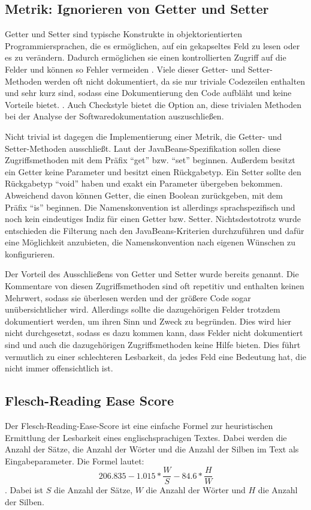\subsection{Metrik: Ignorieren von Getter und Setter }
Getter und Setter sind typische Konstrukte in objektorientierten Programmiersprachen, die es ermöglichen, auf ein gekapseltes Feld zu lesen oder es zu verändern. Dadurch ermöglichen sie einen kontrollierten Zugriff auf die Felder und können so Fehler vermeiden \cite[S. 235]{OntheUseofPropertiesinJavaApplications}. Viele dieser Getter- und Setter-Methoden werden oft nicht dokumentiert, da sie nur triviale Codezeilen enthalten und sehr kurz sind, sodass eine Dokumentierung den Code aufbläht und keine Vorteile bietet. \cite[S. 254]{JavadocViolationsandTheirEvolutioninOpen-SourceSoftware}. Auch Checkstyle bietet die Option an, diese trivialen Methoden bei der Analyse der Softwaredokumentation auszuschließen. 

Nicht trivial ist dagegen die Implementierung einer Metrik, die Getter- und Setter-Methoden ausschließt. Laut der JavaBeans-Spezifikation \cite[S. 55]{javabeans} sollen diese Zugriffsmethoden mit dem Präfix \enquote{get} bzw. \enquote{set} beginnen. Außerdem besitzt ein Getter keine Parameter und besitzt einen Rückgabetyp. Ein Setter sollte den Rückgabetyp \enquote{void} haben und exakt ein Parameter übergeben bekommen. Abweichend davon können Getter, die einen Boolean zurückgeben, mit dem Präfix \enquote{is} beginnen. Die Namenskonvention ist allerdings sprachspezifisch und noch kein eindeutiges Indiz für einen Getter bzw. Setter. Nichtsdestotrotz wurde entschieden die Filterung nach den JavaBeans-Kriterien durchzuführen und dafür eine Möglichkeit anzubieten, die Namenskonvention nach eigenen Wünschen zu konfigurieren. 

Der Vorteil des Ausschließens von Getter und Setter wurde bereits genannt. Die Kommentare von diesen Zugriffsmethoden sind oft repetitiv und enthalten keinen Mehrwert, sodass sie überlesen werden und der größere Code sogar unübersichtlicher wird. Allerdings sollte die dazugehörigen Felder trotzdem dokumentiert werden, um ihren Sinn und Zweck zu begründen. Dies wird hier nicht durchgesetzt, sodass es dazu kommen kann, dass Felder nicht dokumentiert sind und auch die dazugehörigen Zugriffsmethoden keine Hilfe bieten. Dies führt vermutlich zu einer schlechteren Lesbarkeit, da jedes Feld eine Bedeutung hat, die nicht immer offensichtlich ist.
\subsection{Flesch-Reading Ease Score}\label{chapter:metrics_flesh}
Der Flesch-Reading-Ease-Score\cite[S. 21]{ThePrinciplesofReadability} ist eine einfache Formel zur heuristischen Ermittlung der Lesbarkeit eines englischsprachigen Textes. Dabei werden die Anzahl der Sätze, die Anzahl der Wörter und die Anzahl der Silben im Text als Eingabeparameter. Die Formel lautet:
\begin{equation}
   206.835-1.015*\frac{W}{S}-84.6*\frac{H}{W}
\end{equation}. Dabei ist $S$ die Anzahl der Sätze, $W$ die Anzahl der Wörter und $H$ die Anzahl der Silben. 

